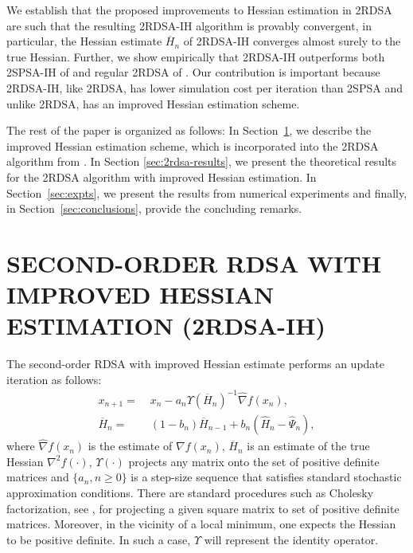 \documentclass[letterpaper, 10 pt, conference]{ieeeconf}  %
\begin{document}
We establish that the proposed improvements to Hessian estimation in 2RDSA are such  that the resulting 2RDSA-IH algorithm is provably convergent, in particular, the Hessian estimate $\overline H_n$ of 2RDSA-IH converges almost surely to the true Hessian. 
Further, we show empirically that 2RDSA-IH outperforms both 2SPSA-IH of \cite{spall-jacobian} and regular 2RDSA of \cite{prashanth2015rdsa}. Our contribution is important because 2RDSA-IH, like 2RDSA, has lower simulation cost per iteration than 2SPSA and unlike 2RDSA, has an improved Hessian estimation scheme.

The rest of the paper is organized as follows: In Section~\ref{sec:2rdsa-ih}, we
describe the improved Hessian estimation scheme, which is incorporated into the  2RDSA algorithm from \cite{prashanth2015rdsa}. In Section \ref{sec:2rdsa-results}, we present the theoretical results for the 2RDSA algorithm with  improved Hessian estimation.
In Section~\ref{sec:expts}, we present the results from numerical experiments and finally, in  Section~\ref{sec:conclusions}, provide the concluding remarks.


\section{SECOND-ORDER RDSA WITH IMPROVED HESSIAN ESTIMATION (2RDSA-IH)}
\label{sec:2rdsa-ih}
The second-order RDSA with improved Hessian estimate performs an update iteration as follows:
\begin{align}
\label{eq:e2rdsa}
x_{n+1} = & \; x_n - a_n \Upsilon(\overline H_n)^{-1}\widehat\nabla f(x_n), \\
\overline H_n = & \; (1-b_{n})  \overline H_{n-1} + b_{n} ( \widehat H_n - \widehat \Psi_n),\label{eq:2rdsa-H}
\end{align}
where $\widehat\nabla f(x_n)$ is the estimate of $\nabla f(x_n)$, 
$\overline H_n$ is an estimate of the true Hessian ${\nabla}^2 f(\cdot)$, $\Upsilon(\cdot)$ projects any matrix onto the set of positive definite matrices and $\{a_n, n\ge 0\}$ is a step-size sequence that satisfies standard stochastic approximation conditions. There are standard procedures such as Cholesky factorization, see \cite{bert22}, for projecting a given square matrix to set of positive definite matrices. Moreover, in the vicinity of a local minimum, one expects the Hessian to be positive definite. In such a case, $\Upsilon$ will represent the identity operator.
\end{document}
